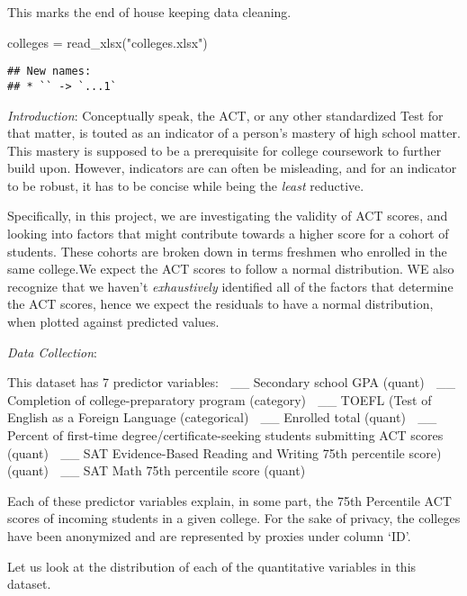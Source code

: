 \documentclass[
]{article}
\newenvironment{Shaded}{\begin{snugshade}}{\end{snugshade}}
\newcommand{\FunctionTok}[1]{\textcolor[rgb]{0.00,0.00,0.00}{#1}}
\newcommand{\NormalTok}[1]{#1}
\newcommand{\OtherTok}[1]{\textcolor[rgb]{0.56,0.35,0.01}{#1}}
\newcommand{\StringTok}[1]{\textcolor[rgb]{0.31,0.60,0.02}{#1}}
\begin{document}
This marks the end of house keeping data cleaning.

\begin{Shaded}
\begin{Highlighting}[]
\NormalTok{colleges }\OtherTok{=} \FunctionTok{read\_xlsx}\NormalTok{(}\StringTok{"colleges.xlsx"}\NormalTok{)}
\end{Highlighting}
\end{Shaded}

\begin{verbatim}
## New names:
## * `` -> `...1`
\end{verbatim}

\emph{Introduction}: Conceptually speak, the ACT, or any other
standardized Test for that matter, is touted as an indicator of a
person's mastery of high school matter. This mastery is supposed to be a
prerequisite for college coursework to further build upon. However,
indicators are can often be misleading, and for an indicator to be
robust, it has to be concise while being the \emph{least} reductive.

Specifically, in this project, we are investigating the validity of ACT
scores, and looking into factors that might contribute towards a higher
score for a cohort of students. These cohorts are broken down in terms
freshmen who enrolled in the same college.We expect the ACT scores to
follow a normal distribution. WE also recognize that we haven't
\emph{exhaustively} identified all of the factors that determine the ACT
scores, hence we expect the residuals to have a normal distribution,
when plotted against predicted values.

\emph{Data Collection}:

This dataset has 7 predictor variables:  \_\_ Secondary school GPA
(quant)  \_\_ Completion of college-preparatory program (category) 
\_\_ TOEFL (Test of English as a Foreign Language (categorical)  \_\_
Enrolled total (quant)  \_\_ Percent of first-time
degree/certificate-seeking students submitting ACT scores (quant)  \_\_
SAT Evidence-Based Reading and Writing 75th percentile score) (quant) 
\_\_ SAT Math 75th percentile score (quant)

Each of these predictor variables explain, in some part, the 75th
Percentile ACT scores of incoming students in a given college. For the
sake of privacy, the colleges have been anonymized and are represented
by proxies under column `ID'.

Let us look at the distribution of each of the quantitative variables in
this dataset.
\end{document}
